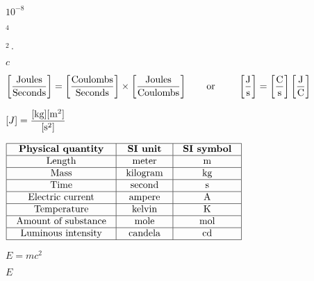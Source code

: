 \documentclass[12pt,a4paper,margin=2cm]{book}
\def\lthtmlcheckvsize{\ifdim\ht\sizebox<\vsize 
  \ifdim\wd\sizebox<\hsize\expandafter\hfill\fi \expandafter\vfill
  \else\expandafter\vss\fi}%
\begin{document}
{\newpage\clearpage
{}%
$ 10^{-8}$%
\lthtmlindisplaymathZ
\lthtmlcheckvsize\clearpage}

{\newpage\clearpage
{}%
$ ^{4}$%
\lthtmlindisplaymathZ
\lthtmlcheckvsize\clearpage}

{\newpage\clearpage
{}%
$ ^{2} \cdot$%
\lthtmlindisplaymathZ
\lthtmlcheckvsize\clearpage}

{\newpage\clearpage
{}%
$ c$%
\lthtmlindisplaymathZ
\lthtmlcheckvsize\clearpage}

{\newpage\clearpage
{}%
$\displaystyle \left[\hbox{Joules} \over \hbox{Seconds} \right] = \left[\hbox{Coulombs} \over \hbox{Seconds}\right] \times \left[\hbox{Joules} \over \hbox{Coulombs}\right] \hbox{\hskip 20pt or \hskip 20pt} \left[\hbox{J} \over \hbox{s} \right] = \left[\hbox{C} \over \hbox{s} \right] \left[\hbox{J} \over \hbox{C} \right]$%
\lthtmlindisplaymathZ
\lthtmlcheckvsize\clearpage}

{\newpage\clearpage
{}%
$\displaystyle [J] = {[\hbox{kg}][\hbox{m}^2] \over [\hbox{s}^2]}$%
\lthtmlindisplaymathZ
\lthtmlcheckvsize\clearpage}

{\newpage\clearpage
{}%
$\displaystyle \vbox{\offinterlineskip
\halign{\strut
\vrule \quad\hfil # \  \hfil & 
\vrule \quad\hfil # \  \hfil & 
\vrule \quad\hfil # \  \hfil \vrule \cr
\noalign{\hrule }
\textbf{Physical quantity} & \textbf{SI unit} & \textbf{SI symbol} \cr
\noalign{\hrule }
Length & meter & m \cr
\noalign{\hrule }
Mass & kilogram & kg \cr
\noalign{\hrule }
Time & second & s \cr
\noalign{\hrule }
Electric current & ampere & A \cr
\noalign{\hrule }
Temperature & kelvin & K \cr
\noalign{\hrule }
Amount of substance & mole & mol \cr
\noalign{\hrule }
Luminous intensity & candela & cd \cr
\noalign{\hrule }
} %
}$%
\lthtmlindisplaymathZ
\lthtmlcheckvsize\clearpage}

{\newpage\clearpage
{}%
$\displaystyle E = mc^2$%
\lthtmlindisplaymathZ
\lthtmlcheckvsize\clearpage}

{\newpage\clearpage
{}%
$ E$%
\lthtmlindisplaymathZ
\lthtmlcheckvsize\clearpage}
\end{document}
